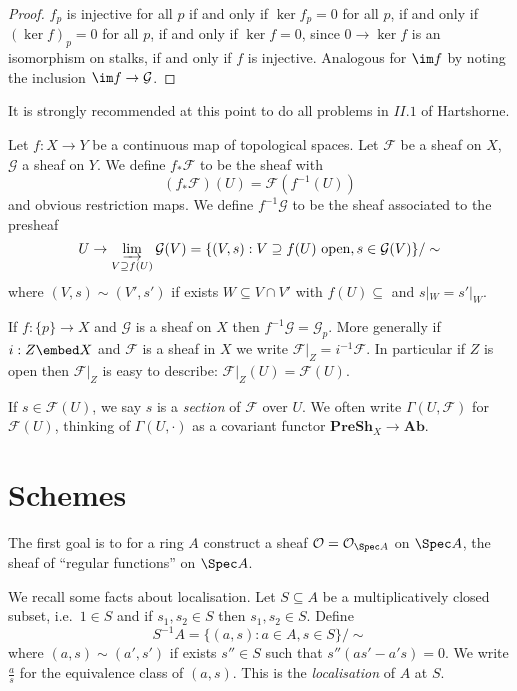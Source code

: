 \documentclass[a4paper]{article}
\renewcommand{\c}[1]{\mathbf{#1}} %
\newcommand{\sh}[1]{\mathcal{#1}} %
\begin{document}
\begin{proof}
  \(f_p\) is injective for all \(p\) if and only if \(\ker f_p = 0\) for all \(p\), if and only if \((\ker f)_p = 0\) for all \(p\), if and only if \(\ker f = 0\), since \(0 \to \ker f\) is an isomorphism on stalks, if and only if \(f\) is injective. Analogous for \(\im f\) by noting the inclusion \(\im f \to \sh G\).
\end{proof}

It is strongly recommended at this point to do all problems in \(II.1\) of Hartshorne.

\begin{definition}
  Let \(f: X \to Y\) be a continuous map of topological spaces. Let \(\sh F\) be a sheaf on \(X\), \(\sh G\) a sheaf on \(Y\). We define \(f_* \sh F\) to be the sheaf with
  \[
    (f_* \sh F)(U) = \sh F (f^{-1}(U))
  \]
  and obvious restriction maps. We define \(f^{-1} \sh G\) to be the sheaf associated to the presheaf
  \[
    U \to \varinjlim_{V \supseteq f(U)} \sh G(V) = \{(V, s): V \supseteq f(U) \text{ open}, s \in \sh G(V)\}/ \sim
  \]
  where \((V, s) \sim (V', s')\) if exists \(W \subseteq V \cap V'\) with \(f(U) \subseteq \) and \(s|_W = s'|_W\).
\end{definition}

\begin{eg}
  If \(f: \{p\} \to X\) and \(\sh G\) is a sheaf on \(X\) then \(f^{-1} \sh G = \sh G_p\). More generally if \(i: Z \embed X\) and \(\sh F\) is a sheaf in \(X\) we write \(\sh F|_Z = i^{-1} \sh F\). In particular if \(Z\) is open then \(\sh F|_Z\) is easy to describe: \(\sh F|_Z(U) = \sh F(U)\).
\end{eg}

\begin{notation}
  If \(s \in \sh F(U)\), we say \(s\) is a \emph{section} of \(\sh F\) over \(U\). We often write \(\Gamma(U, \sh F)\) for \(\sh F(U)\), thinking of \(\Gamma(U, \cdot)\) as a covariant functor \(\c{PreSh}_X \to \c{Ab}\).
\end{notation}

\section{Schemes}

The first goal is to for a ring \(A\) construct a sheaf \(\sh O = \mathcal O_{\Spec A}\) on \(\Spec A\), the sheaf of ``regular functions'' on \(\Spec A\).

We recall some facts about localisation. Let \(S \subseteq A\) be a multiplicatively closed subset, i.e.\ \(1 \in S\) and if \(s_1, s_2 \in S\) then \(s_1, s_2 \in S\). Define
\[
  S^{-1}A = \{(a, s): a \in A, s \in S\}/\sim
\]
where \((a, s) \sim (a', s')\) if exists \(s'' \in S\) such that \(s''(as' - a's) = 0\). We write \(\frac{a}{s}\) for the equivalence class of \((a, s)\). This is the \emph{localisation} of \(A\) at \(S\).
\end{document}
